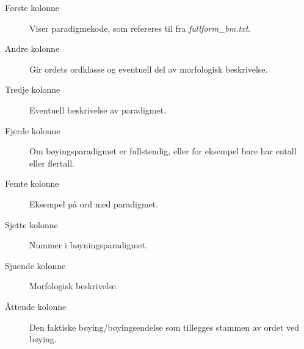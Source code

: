 \begin{description}
\item[Første kolonne] Viser paradigmekode, som refereres til fra \textit{fullform\_bm.txt}.
\item[Andre kolonne] Gir ordets ordklasse og eventuell del av morfologisk beskrivelse.
\item[Tredje kolonne] Eventuell beskrivelse av paradigmet. 
\item[Fjerde kolonne] Om bøyingsparadigmet er fullstendig, eller for eksempel bare har entall eller flertall.
\item[Femte kolonne] Eksempel på ord med paradigmet.
\item[Sjette kolonne] Nummer i bøyningsparadigmet.
\item[Sjuende kolonne] Morfologisk beskrivelse.
\item[Åttende kolonne] Den faktiske bøying/bøyingsendelse som tillegges stammen av ordet ved bøying.
\end{description}